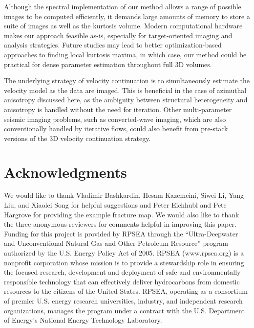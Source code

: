 Although the spectral implementation of our method allows a range of possible images to be computed efficiently, it demands large amounts of memory to store a suite of images as well as the kurtosis volume.  Modern computational hardware makes our approach feasible as-is, especially for target-oriented imaging and analysis strategies.  Future studies may lead to better optimization-based approaches to finding local kurtosis maxima, in which case, our method could be practical for dense parameter estimation throughout full 3D volumes.  

The underlying strategy of velocity continuation is to simultaneously estimate the velocity model as the data are imaged.  This is beneficial in the case of azimuthal anisotropy discussed here, as the ambiguity between structural heterogeneity and anisotropy is handled without the need for iteration.  Other multi-parameter seismic imaging problems, such as converted-wave imaging, which are also conventionally handled by iterative flows, could also benefit from pre-stack versions of the 3D velocity continuation strategy. 


\section{Acknowledgments}
We would like to thank Vladimir Bashkardin, Hesam Kazemeini, Siwei Li, Yang Liu, and Xiaolei Song for helpful suggestions and Peter Eichhubl and Pete Hargrove for providing the example fracture map.  We would also like to thank the three anonymous reviewers for comments helpful in improving this paper.  Funding for this project is provided by RPSEA through the ``Ultra-Deepwater and Unconventional Natural Gas and Other Petroleum Resource'' program authorized by the U.S. Energy Policy Act of 2005.  RPSEA (www.rpsea.org)  is a nonprofit corporation whose mission is to provide a stewardship role in ensuring the focused research, development and deployment of safe and environmentally responsible technology that can effectively deliver hydrocarbons from domestic resources to the citizens of the United States.  RPSEA, operating as a consortium of premier U.S. energy research universities, industry, and independent research organizations, manages the program under a contract with the U.S. Department of Energy's National Energy Technology Laboratory.



